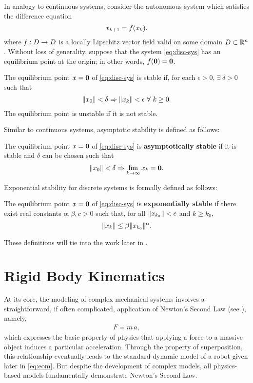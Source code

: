 In analogy to continuous systems, consider the autonomous system which satisfies
the difference equation
\begin{align}
  \label{eq:disc-sys}
  x_{k+1} = f(x_{k}).
\end{align}
where $f : D \to D$ is a locally Lipschitz vector field valid on some domain
$D \subset \mathbb{R}^{n}$.
%
Without loss of generality, suppose that the system \eqref{eq:disc-sys} has an
equilibrium point at the origin;
%
in other words, $f({\mathbf 0}) = {\mathbf 0}$.
%
\begin{definition}
  The equilibrium point $x = {\mathbf 0}$ of \eqref{eq:disc-sys} is stable if,
  for each $\epsilon > 0$, $\exists \ \delta > 0$ such that
  \begin{align*}
    \|x_{0}\| < \delta \Rightarrow \|x_{k}\| < \epsilon \ \forall \ k
    \geq 0.
  \end{align*}
  The equilibrium point is unstable if it is not stable.
\end{definition}
%
Similar to continuous systems, asymptotic stability is defined as follows:
%
\begin{definition}
  The equilibrium point $x = {\mathbf 0}$ of \eqref{eq:disc-sys} is {\bf
    asymptotically stable} if it is stable and $\delta$ can be chosen such that
  \begin{align*}
    \|x_{0}\| < \delta \Rightarrow \lim_{k \to \infty} x_{k} = {\mathbf 0}.
  \end{align*}
\end{definition}
%
Exponential stability for discrete systems is formally defined as follows:
%
\begin{definition}
  The equilibrium point $x = {\mathbf 0}$ of \eqref{eq:disc-sys} is {\bf
    exponentially stable} if there exist real constants $\alpha, \beta, c> 0$
  such that, for all $\|x_{k_{0}}\| < c$ and $k \geq k_{0}$,
  \begin{align*}
    \|x_{k}\| \leq \beta \|x_{k_{0}}\|^{\alpha}.
  \end{align*}
\end{definition}
%
These definitions will tie into the work later in .


\section{Rigid Body Kinematics}

At its core, the modeling of complex mechanical systems involves a
straightforward, if often complicated, application of Newton's Second Law (see
\cite{Feynman1964}), namely,
\begin{align*}
  F = m \, a,
\end{align*}
which expresses the basic property of physics that applying a force to a massive
object induces a particular acceleration.
%
Through the property of superposition, this relationship eventually leads to the
standard dynamic model of a robot given later in \eqref{eq:eom}.
%
But despite the development of complex models, all physics-based models
fundamentally demonstrate Newton's Second Law.

